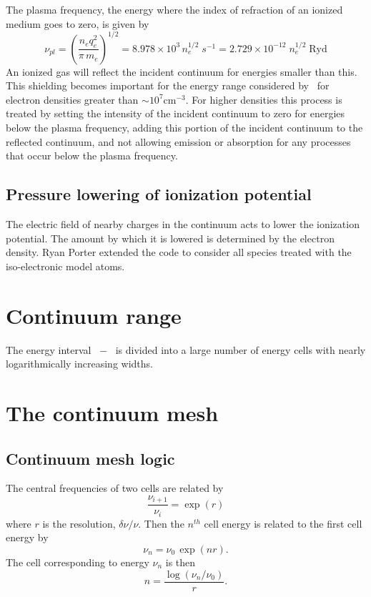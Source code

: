 The plasma frequency, the energy where the index of refraction of an
ionized medium goes to zero, is given by
\begin{equation}
{\nu _{pl}} = {\left( {\frac{{{n_e}q_e^2}}{{\pi \,{m_e}}}} \right)^{1/2}}
= 8.978 \times {10^3}\,n_e^{1/2}\;{s^{ - 1}} = 2.729 \times {10^{ -
12}}\;n_e^{1/2}\;{\mathrm{Ryd}}%
\end{equation}
An ionized gas will reflect the incident continuum for energies smaller
than this.  This shielding becomes important for the energy range considered
by \Cloudy\ for electron densities greater than $\sim 10^7 \mathrm{cm}^{-3}$.  For higher densities
this process is treated by setting the intensity of the incident continuum
to zero for energies below the plasma frequency, adding this portion of
the incident continuum to the reflected continuum, and not allowing emission
or absorption for any processes that occur below the plasma frequency.

\subsection{Pressure lowering of ionization potential}

The electric field of nearby charges in the continuum acts to lower the
ionization potential.  The amount by which it is lowered is determined by
the electron density.
Ryan Porter extended the code to consider all species
treated with the iso-electronic model atoms.
\section{Continuum range}

The energy interval \emm\ $-$ \egamry\ is divided into a
large number of energy cells with nearly logarithmically increasing widths.

\section{The continuum mesh}

\subsection{Continuum mesh logic}

The central frequencies of two cells are related by
\begin{equation}
\frac{{{\nu _{i + 1}}}}{{{\nu _i}}} = \exp(r)%
\end{equation}
where $r$ is the resolution, $\delta \nu/\nu$.
Then the $n^{th}$ cell energy is related to
the first cell energy by
\begin{equation}
{\nu _n} = {\nu _0}\,\exp(nr).%
\end{equation}
The cell corresponding to energy $\nu_n$ is then
\begin{equation}
n = \frac{\log(\nu_n/\nu_0)}{r}.
\end{equation}

